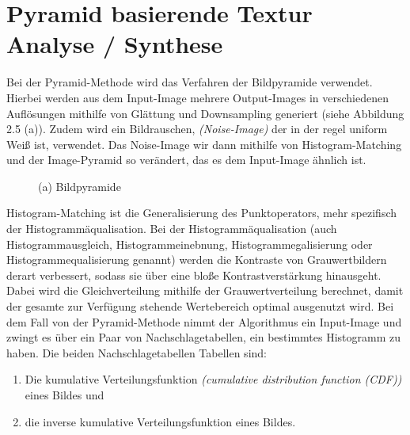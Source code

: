 \documentclass[12pt, a4paper,twoside,openright]{report} %
\begin{document}
\section{Pyramid basierende Textur Analyse / Synthese}

Bei der Pyramid-Methode wird das Verfahren der Bildpyramide verwendet.
Hierbei werden aus dem Input-Image mehrere Output-Images in verschiedenen Auflösungen mithilfe von Glättung und Downsampling generiert {(siehe Abbildung 2.5 (a))}. \cite{Heeger}
\newline
Zudem wird ein Bildrauschen, \textit{(Noise-Image)} der in der regel uniform Weiß ist, verwendet.
Das Noise-Image wir dann mithilfe von Histogram-Matching und der Image-Pyramid so verändert, das es dem Input-Image ähnlich ist.

\begin{figure}[H]
    \centering
    \caption{(a) Bildpyramide}%
\end{figure}

Histogram-Matching ist die Generalisierung des Punktoperators, mehr spezifisch der Histogrammäqualisation.
Bei der Histogrammäqualisation {(auch Histogrammausgleich, Histogrammeinebnung, Histogrammegalisierung oder Histogrammequalisierung genannt)}
werden die Kontraste von Grauwertbildern derart verbessert, sodass sie über eine bloße Kontrastverstärkung hinausgeht.
Dabei wird die Gleichverteilung mithilfe der Grauwertverteilung berechnet, damit der gesamte zur Verfügung stehende Wertebereich optimal ausgenutzt wird. \cite{Lehmann2013}
Bei dem Fall von der Pyramid-Methode nimmt der Algorithmus ein Input-Image und zwingt es über ein Paar von Nachschlagetabellen, ein bestimmtes Histogramm zu haben.
Die beiden Nachschlagetabellen Tabellen sind:

\begin{enumerate}
    \item Die kumulative Verteilungsfunktion \textit{(cumulative distribution function (CDF))} eines Bildes und
    \item die inverse kumulative Verteilungsfunktion eines Bildes.
  \end{enumerate}
\end{document}
